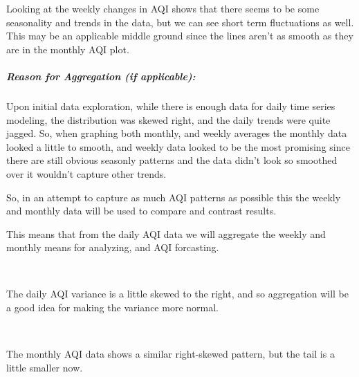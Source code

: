 \documentclass[11pt, twocolumn]{article}
\begin{document}
    Looking at the weekly changes in AQI shows that there seems to be some
seasonality and trends in the data, but we can see short term
fluctuations as well. This may be an applicable middle ground since the
lines aren't as smooth as they are in the monthly AQI plot.

    \subparagraph{Reason for Aggregation (if
applicable):}\label{reason-for-aggregation-if-applicable}

    Upon initial data exploration, while there is enough data for daily time
series modeling, the distribution was skewed right, and the daily trends
were quite jagged. So, when graphing both monthly, and weekly averages
the monthly data looked a little to smooth, and weekly data looked to be
the most promising since there are still obvious seasonly patterns and
the data didn't look so smoothed over it wouldn't capture other trends.

So, in an attempt to capture as much AQI patterns as possible this the
weekly and monthly data will be used to compare and contrast results.

This means that from the daily AQI data we will aggregate the weekly and
monthly means for analyzing, and AQI forcasting.

    \begin{center}
    \end{center}
    { \hspace*{\fill} \\}
    
    The daily AQI variance is a little skewed to the right, and so
aggregation will be a good idea for making the variance more normal.

    \begin{center}
    \end{center}
    { \hspace*{\fill} \\}
    
    The monthly AQI data shows a similar right-skewed pattern, but the tail
is a little smaller now.

    \begin{center}
    \end{center}
    { \hspace*{\fill} \\}
    
\end{document}
